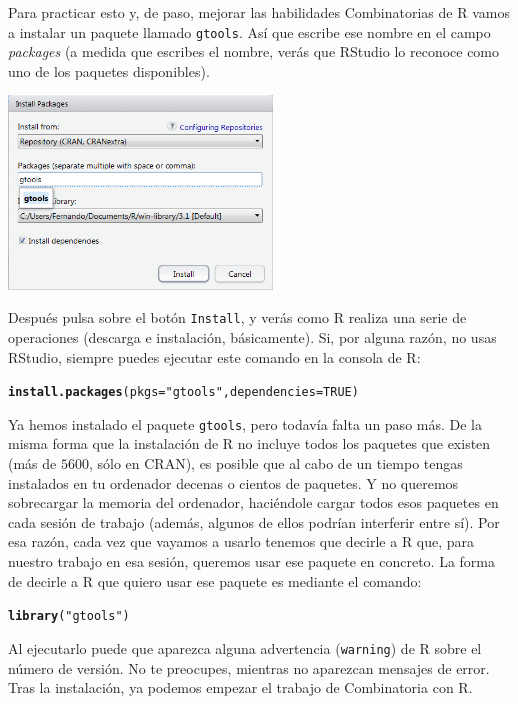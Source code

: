 \documentclass[10pt,a4paper]{article}\usepackage[]{graphicx}\usepackage[]{color}
\makeatletter
\newcommand{\hlnum}[1]{\textcolor[rgb]{0.686,0.059,0.569}{#1}}%
\newcommand{\hlstr}[1]{\textcolor[rgb]{0.192,0.494,0.8}{#1}}%
\newcommand{\hlstd}[1]{\textcolor[rgb]{0.345,0.345,0.345}{#1}}%
\newcommand{\hlkwc}[1]{\textcolor[rgb]{0.333,0.667,0.333}{#1}}%
\newcommand{\hlkwd}[1]{\textcolor[rgb]{0.737,0.353,0.396}{\textbf{#1}}}%
\newenvironment{kframe}{%
 \def\at@end@of@kframe{}%
 \ifinner\ifhmode%
  \def\at@end@of@kframe{\end{minipage}}%
  \begin{minipage}{\columnwidth}%
 \fi\fi%
 \def\FrameCommand##1{\hskip\@totalleftmargin \hskip-\fboxsep
 \colorbox{shadecolor}{##1}\hskip-\fboxsep
     \hskip-\linewidth \hskip-\@totalleftmargin \hskip\columnwidth}%
 \MakeFramed {\advance\hsize-\width
   \@totalleftmargin\z@ \linewidth\hsize
   \@setminipage}}%
 {\par\unskip\endMakeFramed%
 \at@end@of@kframe}
\newenvironment{knitrout}{}{} %
\makeatother
\begin{document}
Para practicar esto y, de paso, mejorar las habilidades Combinatorias de R vamos a instalar un paquete llamado {\tt gtools}. Así que escribe ese nombre en el campo {\em packages} (a medida que escribes el nombre, verás que RStudio lo reconoce como uno de los  paquetes disponibles).
    \begin{center}
    \includegraphics[width=7cm]{../fig/Tut03-InstalarGtools2.png}
    \end{center}
Después pulsa sobre el botón {\tt Install}, y verás como R realiza una serie de operaciones (descarga e instalación, básicamente). Si, por alguna razón, no usas RStudio, siempre puedes ejecutar este comando en la consola de R:
\begin{knitrout}
\color{fgcolor}\begin{kframe}
\begin{alltt}
\hlkwd{install.packages}\hlstd{(}\hlkwc{pkgs}\hlstd{=}\hlstr{"gtools"}\hlstd{,}\hlkwc{dependencies}\hlstd{=}\hlnum{TRUE}\hlstd{)}
\end{alltt}
\end{kframe}
\end{knitrout}
Ya hemos instalado el paquete {\tt gtools}, pero todavía falta un paso más. De la misma forma que la instalación de R no incluye todos los paquetes que existen (más de $5600$, sólo en CRAN), es posible que al cabo de un tiempo tengas instalados en tu ordenador decenas o cientos de paquetes. Y no queremos sobrecargar la memoria del ordenador, haciéndole cargar todos esos paquetes en cada sesión de trabajo (además, algunos de ellos podrían interferir entre sí). Por esa razón, cada vez que vayamos a usarlo tenemos que decirle a R que, para nuestro trabajo en esa sesión, queremos usar ese paquete en concreto. La forma de decirle a R que quiero usar ese paquete es mediante el comando:
\begin{knitrout}
\color{fgcolor}\begin{kframe}
\begin{alltt}
\hlkwd{library}\hlstd{(}\hlstr{"gtools"}\hlstd{)}
\end{alltt}
\end{kframe}
\end{knitrout}
Al ejecutarlo puede que aparezca alguna advertencia ({\tt warning}) de R sobre el número de versión. No te preocupes, mientras no aparezcan mensajes de error. Tras la instalación, ya podemos empezar el trabajo de Combinatoria con R.
\end{document}
